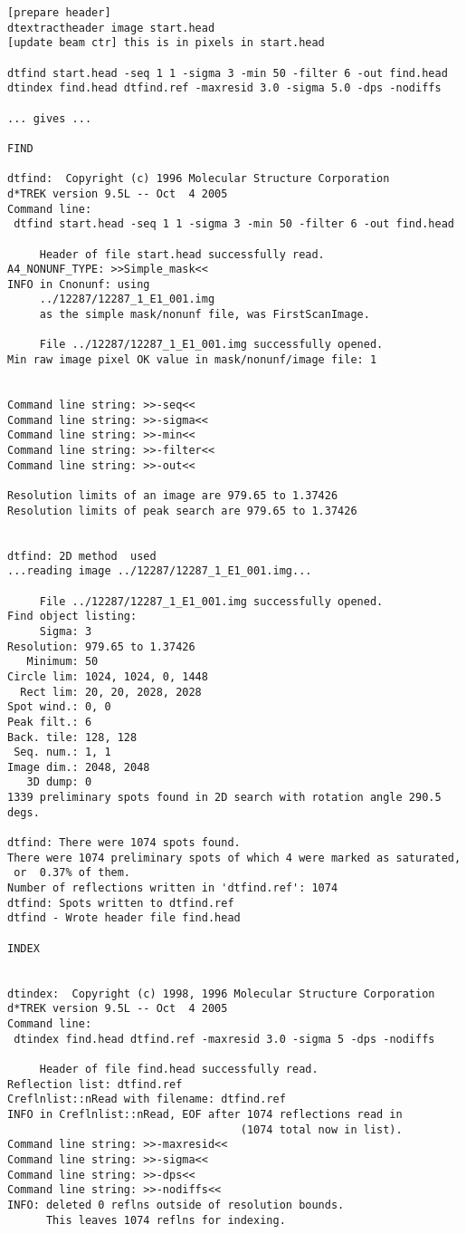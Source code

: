 \documentclass[a4paper, 11pt]{article}
\begin{document}
{
\small
\begin{verbatim}
[prepare header]
dtextractheader image start.head
[update beam ctr] this is in pixels in start.head

dtfind start.head -seq 1 1 -sigma 3 -min 50 -filter 6 -out find.head
dtindex find.head dtfind.ref -maxresid 3.0 -sigma 5.0 -dps -nodiffs

... gives ...

FIND

dtfind:  Copyright (c) 1996 Molecular Structure Corporation
d*TREK version 9.5L -- Oct  4 2005
Command line:
 dtfind start.head -seq 1 1 -sigma 3 -min 50 -filter 6 -out find.head

     Header of file start.head successfully read.
A4_NONUNF_TYPE: >>Simple_mask<<
INFO in Cnonunf: using
     ../12287/12287_1_E1_001.img
     as the simple mask/nonunf file, was FirstScanImage.

     File ../12287/12287_1_E1_001.img successfully opened.
Min raw image pixel OK value in mask/nonunf/image file: 1


Command line string: >>-seq<<
Command line string: >>-sigma<<
Command line string: >>-min<<
Command line string: >>-filter<<
Command line string: >>-out<<

Resolution limits of an image are 979.65 to 1.37426
Resolution limits of peak search are 979.65 to 1.37426


dtfind: 2D method  used
...reading image ../12287/12287_1_E1_001.img...

     File ../12287/12287_1_E1_001.img successfully opened.
Find object listing:
     Sigma: 3
Resolution: 979.65 to 1.37426
   Minimum: 50
Circle lim: 1024, 1024, 0, 1448
  Rect lim: 20, 20, 2028, 2028
Spot wind.: 0, 0
Peak filt.: 6
Back. tile: 128, 128
 Seq. num.: 1, 1
Image dim.: 2048, 2048
   3D dump: 0
1339 preliminary spots found in 2D search with rotation angle 290.5 degs.

dtfind: There were 1074 spots found.
There were 1074 preliminary spots of which 4 were marked as saturated,
 or  0.37% of them.
Number of reflections written in 'dtfind.ref': 1074
dtfind: Spots written to dtfind.ref
dtfind - Wrote header file find.head

INDEX


dtindex:  Copyright (c) 1998, 1996 Molecular Structure Corporation
d*TREK version 9.5L -- Oct  4 2005
Command line:
 dtindex find.head dtfind.ref -maxresid 3.0 -sigma 5 -dps -nodiffs

     Header of file find.head successfully read.
Reflection list: dtfind.ref
Creflnlist::nRead with filename: dtfind.ref
INFO in Creflnlist::nRead, EOF after 1074 reflections read in
                                    (1074 total now in list).
Command line string: >>-maxresid<<
Command line string: >>-sigma<<
Command line string: >>-dps<<
Command line string: >>-nodiffs<<
INFO: deleted 0 reflns outside of resolution bounds.
      This leaves 1074 reflns for indexing.


\end{verbatim}}
\end{document}
